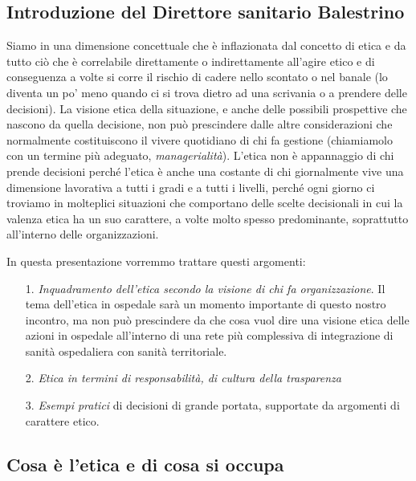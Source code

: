 \subsection{Introduzione del Direttore sanitario Balestrino}

Siamo in una dimensione concettuale che è inflazionata dal concetto di
etica e da tutto ciò che è correlabile direttamente o indirettamente
all'agire etico e di conseguenza a volte si corre il rischio di cadere
nello scontato o nel banale (lo diventa un po' meno quando ci si trova
dietro ad una scrivania o a prendere delle decisioni). La visione etica
della situazione, e anche delle possibili prospettive che nascono da
quella decisione, non può prescindere dalle altre considerazioni che
normalmente costituiscono il vivere quotidiano di chi fa gestione
(chiamiamolo con un termine più adeguato, \emph{managerialità}). L'etica
non è appannaggio di chi prende decisioni perché l'etica è anche una
costante di chi giornalmente vive una dimensione lavorativa a tutti i
gradi e a tutti i livelli, perché ogni giorno ci troviamo in molteplici
situazioni che comportano delle scelte decisionali in cui la valenza
etica ha un suo carattere, a volte molto spesso predominante,
soprattutto all'interno delle organizzazioni.

In questa presentazione vorremmo trattare questi argomenti:

\begin{itemize}
\item[1.]
  \emph{Inquadramento dell'etica secondo la visione di chi fa
  organizzazione}. Il tema dell'etica in ospedale sarà un momento
  importante di questo nostro incontro, ma non può prescindere da che
  cosa vuol dire una visione etica delle azioni in ospedale all'interno
  di una rete più complessiva di integrazione di sanità ospedaliera con
  sanità territoriale.
\item[2.]
  \emph{Etica in termini di responsabilità, di cultura della
  trasparenza}
\item[3.]
  \emph{Esempi pratici} di decisioni di grande portata, supportate da
  argomenti di carattere etico.
\end{itemize}

\subsection{Cosa è l'etica e di cosa si occupa}

